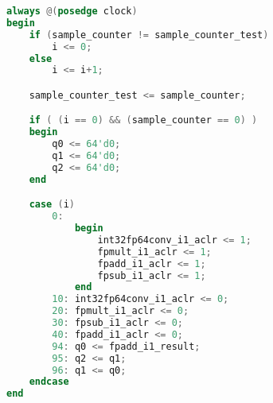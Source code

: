 \begin{lstlisting}[language=verilog,caption={Algorytm Goertzla -- pętla},label={lst:loop}]
always @(posedge clock)
begin
	if (sample_counter != sample_counter_test)
		i <= 0;
	else
		i <= i+1;

	sample_counter_test <= sample_counter;

	if ( (i == 0) && (sample_counter == 0) )
	begin
		q0 <= 64'd0;
		q1 <= 64'd0;
		q2 <= 64'd0;
	end

	case (i)
		0:
			begin
				int32fp64conv_i1_aclr <= 1;
				fpmult_i1_aclr <= 1;
				fpadd_i1_aclr <= 1;
				fpsub_i1_aclr <= 1;
			end
		10: int32fp64conv_i1_aclr <= 0;
		20:	fpmult_i1_aclr <= 0;
		30: fpsub_i1_aclr <= 0;
		40: fpadd_i1_aclr <= 0;
		94: q0 <= fpadd_i1_result;
		95: q2 <= q1;
		96: q1 <= q0;
	endcase
end
\end{lstlisting}
\vspace{10pt}

